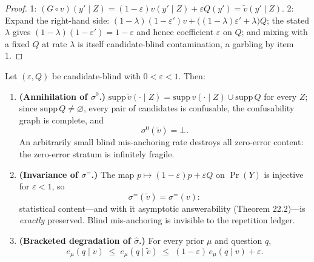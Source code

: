 \begin{proof}

1: \((G \circ v)(y' \mid Z) = (1-\varepsilon) v(y' \mid Z) + \varepsilon Q(y') = \tilde v(y' \mid Z)\). 2: Expand the right-hand side: \((1-\lambda)(1-\varepsilon') v + \big((1-\lambda)\varepsilon' + \lambda\big) Q\); the stated \(\lambda\) gives \((1-\lambda)(1-\varepsilon') = 1 - \varepsilon\) and hence coefficient \(\varepsilon\) on \(Q\); and mixing with a fixed \(Q\) at rate \(\lambda\) is itself candidate-blind contamination, a garbling by item 1.
\end{proof}

\begin{thmplain}

Let \((\varepsilon, Q)\) be candidate-blind with \(0 < \varepsilon < 1\). Then:

\begin{enumerate}
\def\labelenumi{\arabic{enumi}.}
\item
  \textbf{(Annihilation of \(\sigma^0\).)} \(\mathrm{supp}\,\tilde v(\cdot \mid Z) = \mathrm{supp}\, v(\cdot \mid Z) \cup \mathrm{supp}\, Q\) for every \(Z\); since \(\mathrm{supp}\,Q \ne \varnothing\), every pair of candidates is confusable, the confusability graph is complete, and
  \[
  \sigma^{0}(\tilde v) = \bot .
  \]
  An arbitrarily small blind mis-anchoring rate destroys all zero-error content: the zero-error stratum is infinitely fragile.
\item
  \textbf{(Invariance of \(\sigma^=\).)} The map \(p \mapsto (1-\varepsilon)p + \varepsilon Q\) on \(\Pr(Y)\) is injective for \(\varepsilon < 1\), so
  \[
  \sigma^{=}(\tilde v) = \sigma^{=}(v):
  \]
  statistical content---\hspace{0pt}and with it asymptotic answerability (Theorem 22.2)---\hspace{0pt}is \emph{exactly} preserved. Blind mis-anchoring is invisible to the repetition ledger.
\item
  \textbf{(Bracketed degradation of \(\widehat\sigma\).)} For every prior \(\mu\) and question \(q\),
  \[
  e_\mu(q \mid v) \;\le\; e_\mu(q \mid \tilde v) \;\le\; (1 - \varepsilon)\, e_\mu(q \mid v) + \varepsilon .
  \]
\end{enumerate}
\end{thmplain}

